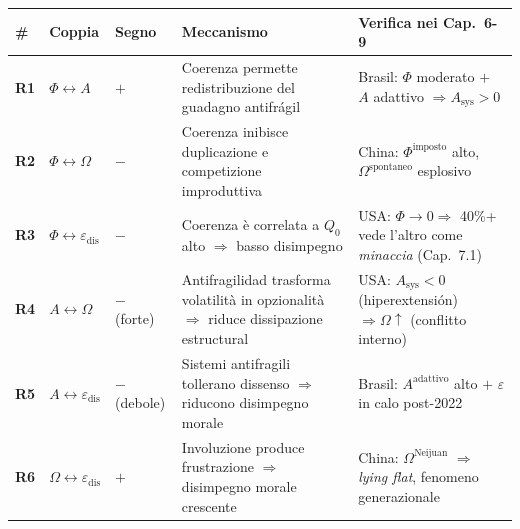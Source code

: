 {\def\LTcaptype{none} %
{\small\begin{longtable}[]{@{}
  >{\raggedright\arraybackslash}p{}
  >{\raggedright\arraybackslash}p{}
  >{\raggedright\arraybackslash}p{}
  >{\raggedright\arraybackslash}p{}
  >{\raggedright\arraybackslash}p{}@{}}
\toprule\noalign{}
\begin{minipage}[b]{\linewidth}\raggedright
\#
\end{minipage} & \begin{minipage}[b]{\linewidth}\raggedright
Coppia
\end{minipage} & \begin{minipage}[b]{\linewidth}\raggedright
Segno
\end{minipage} & \begin{minipage}[b]{\linewidth}\raggedright
Meccanismo
\end{minipage} & \begin{minipage}[b]{\linewidth}\raggedright
Verifica nei Cap.~6-9
\end{minipage} \\
\midrule\noalign{}
\endhead
\bottomrule\noalign{}
\endlastfoot
\textbf{R1} & \(\Phi \leftrightarrow A\) & \(+\) & Coerenza permette
redistribuzione del guadagno antifrágil & Brasil: \(\Phi\) moderato
\(+\) \(A\) adattivo \(\Rightarrow A_{\text{sys}} > 0\) \\
\textbf{R2} & \(\Phi \leftrightarrow \Omega\) & \(-\) & Coerenza
inibisce duplicazione e competizione improduttiva & China:
\(\Phi^{\text{imposto}}\) alto, \(\Omega^{\text{spontaneo}}\)
esplosivo \\
\textbf{R3} & \(\Phi \leftrightarrow \varepsilon_{\text{dis}}\) & \(-\)
& Coerenza è correlata a \(Q_0\) alto \(\Rightarrow\) basso disimpegno &
USA: \(\Phi \to 0 \Rightarrow\) 40\%+ vede l'altro come \emph{minaccia}
(Cap.~7.1) \\
\textbf{R4} & \(A \leftrightarrow \Omega\) & \(-\) (forte) &
Antifragilidad trasforma volatilità in opzionalità \(\Rightarrow\) riduce
dissipazione estructural & USA: \(A_{\text{sys}} < 0\) (hiperextensión)
\(\Rightarrow \Omega \uparrow\) (conflitto interno) \\
\textbf{R5} & \(A \leftrightarrow \varepsilon_{\text{dis}}\) & \(-\)
(debole) & Sistemi antifragili tollerano dissenso \(\Rightarrow\)
riducono disimpegno morale & Brasil: \(A^{\text{adattivo}}\) alto \(+\)
\(\varepsilon\) in calo post-2022 \\
\textbf{R6} & \(\Omega \leftrightarrow \varepsilon_{\text{dis}}\) &
\(+\) & Involuzione produce frustrazione \(\Rightarrow\) disimpegno
morale crescente & China: \(\Omega^{\text{Neijuan}}\) \(\Rightarrow\)
\emph{lying flat}, fenomeno generazionale \\
\end{longtable}}
}

